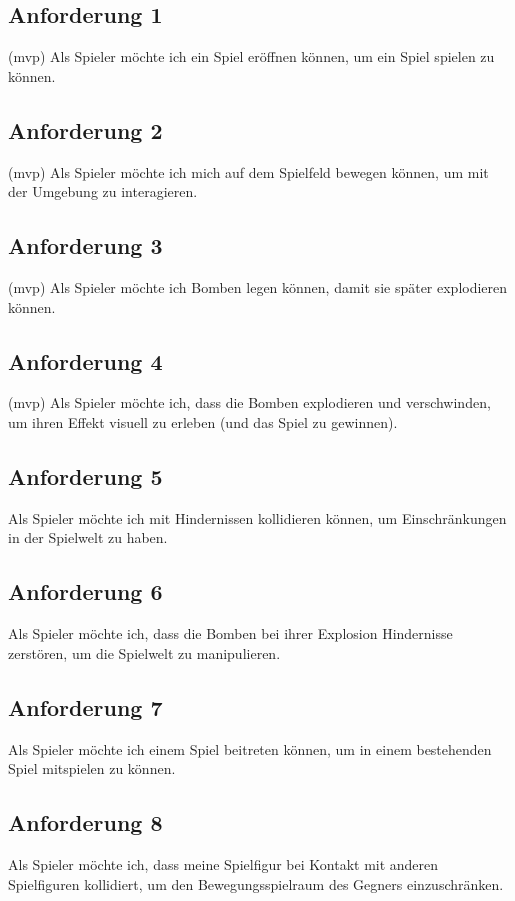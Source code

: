 \documentclass[conference]{IEEEtran}
\begin{document}
\subsection{Anforderung 1} (mvp)
Als Spieler möchte ich ein Spiel eröffnen können, um ein Spiel spielen zu können.

\subsection{Anforderung 2} (mvp)
Als Spieler möchte ich mich auf dem Spielfeld bewegen können, um mit der Umgebung zu interagieren.

\subsection{Anforderung 3} (mvp)
Als Spieler möchte ich Bomben legen können, damit sie später explodieren können.

\subsection{Anforderung 4} (mvp)
Als Spieler möchte ich, dass die Bomben explodieren und verschwinden, um ihren Effekt visuell zu erleben (und das Spiel zu gewinnen).

\subsection{Anforderung 5} 
Als Spieler möchte ich mit Hindernissen kollidieren können, um Einschränkungen in der Spielwelt zu haben.

\subsection{Anforderung 6}
Als Spieler möchte ich, dass die Bomben bei ihrer Explosion Hindernisse zerstören, um die Spielwelt zu manipulieren.

\subsection{Anforderung 7} 
Als Spieler möchte ich einem Spiel beitreten können, um in einem bestehenden Spiel mitspielen zu können.

\subsection{Anforderung 8}
Als Spieler möchte ich, dass meine Spielfigur bei Kontakt mit anderen Spielfiguren kollidiert, um den Bewegungsspielraum des Gegners einzuschränken.
\end{document}
